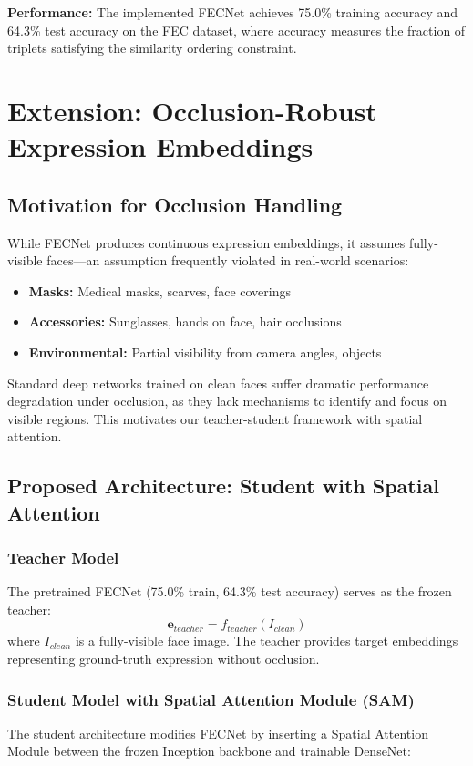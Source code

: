 \documentclass[10pt,twocolumn]{article}
\begin{document}
\textbf{Performance:} The implemented FECNet achieves 75.0\% training accuracy and 64.3\% test accuracy on the FEC dataset, where accuracy measures the fraction of triplets satisfying the similarity ordering constraint.

\section{Extension: Occlusion-Robust Expression Embeddings}

\subsection{Motivation for Occlusion Handling}
While FECNet produces continuous expression embeddings, it assumes fully-visible faces—an assumption frequently violated in real-world scenarios:
\begin{itemize}
    \item \textbf{Masks:} Medical masks, scarves, face coverings
    \item \textbf{Accessories:} Sunglasses, hands on face, hair occlusions
    \item \textbf{Environmental:} Partial visibility from camera angles, objects
\end{itemize}

Standard deep networks trained on clean faces suffer dramatic performance degradation under occlusion, as they lack mechanisms to identify and focus on visible regions. This motivates our teacher-student framework with spatial attention.

\subsection{Proposed Architecture: Student with Spatial Attention}

\subsubsection{Teacher Model}
The pretrained FECNet (75.0\% train, 64.3\% test accuracy) serves as the frozen teacher:
\begin{equation}
\mathbf{e}_{teacher} = f_{teacher}(I_{clean})
\end{equation}
where $I_{clean}$ is a fully-visible face image. The teacher provides target embeddings representing ground-truth expression without occlusion.

\subsubsection{Student Model with Spatial Attention Module (SAM)}
The student architecture modifies FECNet by inserting a Spatial Attention Module between the frozen Inception backbone and trainable DenseNet:
\end{document}
